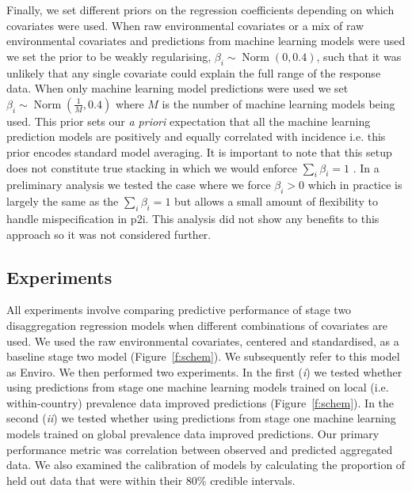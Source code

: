 \documentclass[review]{elsarticle}
\begin{document}
Finally, we set different priors on the regression coefficients depending on which covariates were used.
When raw environmental covariates or a mix of raw environmental covariates and predictions from machine learning models were used we set the prior to be weakly regularising, $\beta_i \sim \operatorname{Norm}(0, 0.4)$, such that it was unlikely that any single covariate could explain the full range of the response data.
When only machine learning model predictions were used we set $\beta_i \sim \operatorname{ Norm}(\frac{1}{M}, 0.4)$ where $M$ is the number of machine learning models being used. 
This prior  sets our \emph{a priori} expectation that all the machine learning prediction models are positively and equally correlated with incidence i.e. this prior encodes standard model averaging.
It is important to note that this setup does not constitute true stacking in which we would enforce $\sum_i \beta_i = 1$ \citep{bhatt2017improved}.
In a preliminary analysis we tested the case where we force $\beta_i > 0$ which in practice is largely the same as the $\sum_i \beta_i = 1$  \citep{breiman1996stacked} but allows a small amount of flexibility to handle mispecification in $\mathrm{p2i}$.
This analysis did not show any benefits to this approach so it was not considered further.



\subsection{Experiments}



All experiments involve comparing predictive performance of stage two disaggregation regression models when different combinations of covariates are used.
We used the raw environmental covariates, centered and standardised, as a baseline stage two model (Figure~\ref{f:schem}).
We subsequently refer to this model as Enviro.
We then performed two experiments.
In the first (\emph{i}) we tested whether using predictions from stage one machine learning models trained on local (i.e. within-country) prevalence data improved predictions (Figure~\ref{f:schem}).
In the second (\emph{ii}) we tested whether using predictions from stage one machine learning models trained on global prevalence data improved predictions.
Our primary performance metric was correlation between observed and predicted aggregated  data.
We also examined the calibration of models by calculating the proportion of held out data that were within their 80\% credible intervals.
\end{document}
